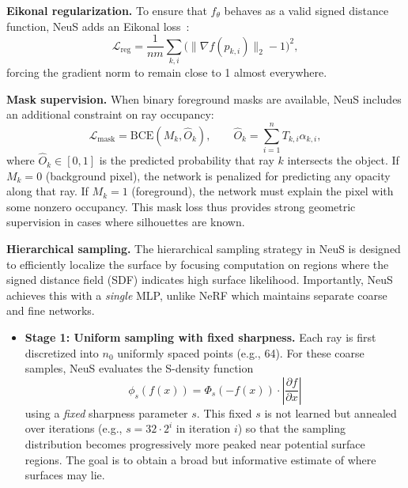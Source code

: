 \begin{enrichment}
\begin{enrichment}
        \medskip
        \noindent\textbf{Eikonal regularization.}  
        To ensure that \(f_\theta\) behaves as a valid signed distance function, NeuS adds an Eikonal loss~\cite{gropp2020implicit}:
        \begin{equation}
            \mathcal{L}_{\text{reg}} =
            \frac{1}{nm} \sum_{k,i}
            \bigl(\|\nabla f(\hat{p}_{k,i})\|_2 - 1\bigr)^2, 
        \end{equation}
        forcing the gradient norm to remain close to 1 almost everywhere.
        
        \medskip
        \noindent\textbf{Mask supervision.}  
        When binary foreground masks are available, NeuS includes an additional constraint on ray occupancy:
        \begin{equation}
            \mathcal{L}_{\text{mask}} =
            \text{BCE}(M_k, \hat{O}_k),
            \qquad 
            \hat{O}_k = \sum_{i=1}^n T_{k,i}\alpha_{k,i},
        \end{equation}
        where \(\hat{O}_k \in [0,1]\) is the predicted probability that ray \(k\) intersects the object. If \(M_k=0\) (background pixel), the network is penalized for predicting any opacity along that ray. If \(M_k=1\) (foreground), the network must explain the pixel with some nonzero occupancy. This mask loss thus provides strong geometric supervision in cases where silhouettes are known.
        
        \medskip
        \noindent\textbf{Hierarchical sampling.}  
        The hierarchical sampling strategy in NeuS is designed to efficiently localize the surface by focusing computation on regions where the signed distance field (SDF) indicates high surface likelihood. Importantly, NeuS achieves this with a \emph{single} MLP, unlike NeRF which maintains separate coarse and fine networks.
        
        \begin{itemize}
            \item \textbf{Stage 1: Uniform sampling with fixed sharpness.}  
            Each ray is first discretized into \(n_0\) uniformly spaced points (e.g., 64). For these coarse samples, NeuS evaluates the S-density function 
            \[
            \phi_{s}(f(x)) = \Phi_s(-f(x)) \cdot \left| \frac{\partial f}{\partial x} \right|
            \] 
            using a \emph{fixed} sharpness parameter \( s \). This fixed \( s \) is not learned but annealed over iterations (e.g., \( s = 32 \cdot 2^i \) in iteration \(i\)) so that the sampling distribution becomes progressively more peaked near potential surface regions. The goal is to obtain a broad but informative estimate of where surfaces may lie.
            

\end{itemize}
\end{enrichment}
\end{enrichment}
